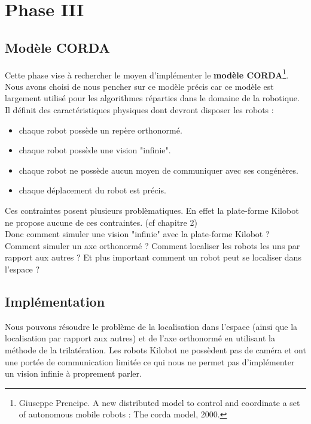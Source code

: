 \documentclass[a4paper,8pt]{report}
\begin{document}
\chapter{Phase III}

\section*{Modèle CORDA}\label{sec:name}

Cette phase vise à rechercher le moyen d'impl\'ementer le  \textbf{mod\`ele CORDA}\footnote{Giuseppe Prencipe. A new distributed model to control and coordinate a set of autonomous mobile
robots : The corda model, 2000.}.\\
Nous avons choisi de nous pencher sur ce mod\`ele pr\'ecis car ce mod\`ele est largement utilis\'e pour les algorithmes r\'eparties dans le domaine de la robotique.\\

Il d\'efinit des caract\'eristiques physiques dont devront disposer les robots :

\begin{itemize}
\item chaque robot poss\`ede un rep\`ere orthonorm\'e.
\item chaque robot poss\`ede une vision "infinie".
\item chaque robot ne poss\`ede aucun moyen de communiquer avec ses cong\'en\`eres.
\item chaque d\'eplacement du robot est pr\'ecis.
\end{itemize}

\medskip
Ces contraintes posent plusieurs probl\`ematiques. En effet la plate-forme Kilobot ne propose aucune de ces contraintes. (cf chapitre 2)\\
Donc comment simuler une vision "infinie" avec la plate-forme Kilobot ? Comment simuler un axe orthonorm\'e ? Comment localiser les robots les uns par rapport aux autres ? Et plus important comment un robot peut se localiser dans l'espace ?\\


\section*{Impl\'ementation}\label{sec:name}

Nous pouvons r\'esoudre le probl\`eme de la localisation dans l'espace (ainsi que la localisation par rapport aux autres) et de l'axe orthonorm\'e en utilisant la m\'ethode de la trilat\'eration. Les robots Kilobot ne poss\`edent pas de cam\'era et ont une port\'ee de communication limit\'ee ce qui nous ne permet pas d'impl\'ementer un vision infinie \`a proprement parler.\\
\end{document}
